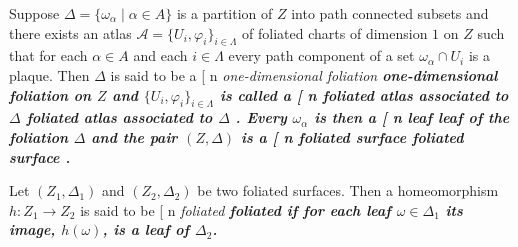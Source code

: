 \documentclass[12pt, reqno]{amsart}
\makeatletter
\def\myemphInternal#1{\if n\f@shape%
\begingroup\itshape #1\endgroup\/%
\else\begingroup\bfseries #1\endgroup%
\fi}
\def\myemph{\futurelet\testchar\MaybeOptArgmyemph}
\def\MaybeOptArgmyemph{\ifx[\testchar \let\next\OptArgmyemph
                 \else \let\next\NoOptArgmyemph \fi \next}
\def\OptArgmyemph[#1]#2{\index{#1}\myemphInternal{#2}}
\def\NoOptArgmyemph#1{\myemphInternal{#1}}
\newcommand\Usp{U}
\newcommand\chartMap{\varphi} %
\newcommand{\Partition}{\Delta}
\newcommand{\leaf}{\omega}
\newcommand{\stripSurf}{Z}
\makeatother
\begin{document}
Suppose $\Partition = \{ \leaf_\alpha \mid \alpha \in A \}$ is a partition of $\stripSurf$ into path connected subsets and there exists an atlas $\mathcal{A} = \{\Usp_i, \chartMap_i\}_{i\in\Lambda}$ of foliated charts of dimension $1$ on $\stripSurf$ such that for each $\alpha \in A$ and each $i \in \Lambda$ every path component of a set $\leaf_\alpha \cap \Usp_i$ is a plaque.
Then $\Partition$ is said to be a \myemph{one-dimensional foliation} on $\stripSurf$ and $\{\Usp_i, \chartMap_i\}_{i\in\Lambda}$ is called a \myemph{foliated atlas associated to $\Partition$}.
Every $\leaf_\alpha$ is then a \myemph{leaf} of the foliation $\Partition$ and the pair $(\stripSurf, \Partition)$ is a \myemph{foliated surface}.

Let $(\stripSurf_1, \Partition_1)$ and $(\stripSurf_2, \Partition_2)$ be two foliated surfaces.
Then a homeomorphism $h:\stripSurf_1 \to \stripSurf_2$ is said to be \myemph{foliated} if for each leaf $\leaf \in\Partition_1$ its image, $h(\leaf)$, is a leaf of $\Partition_2$.
\end{document}
